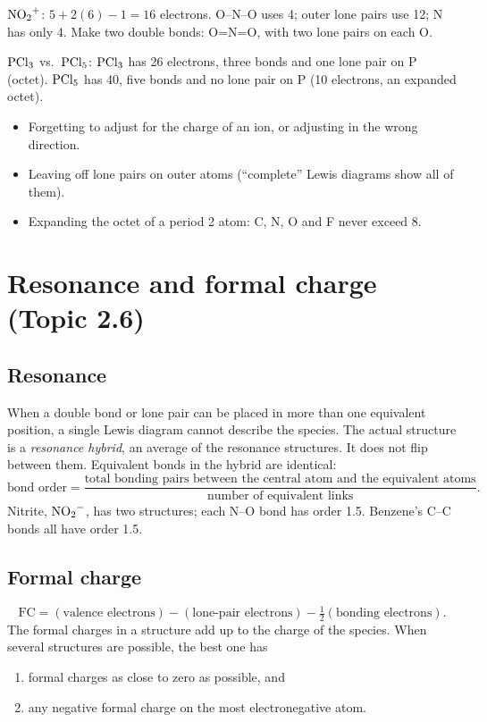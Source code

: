 \documentclass[11pt]{article}
\begin{document}
 $\ce{NO2+}$: $5 + 2(6) - 1 = 16$ electrons. O--N--O uses 4; outer lone pairs use 12; N has only 4. Make two double bonds: O=N=O, with two lone pairs on each O.

 $\ce{PCl3}$ vs.\ $\ce{PCl5}$: $\ce{PCl3}$ has 26 electrons, three bonds and one lone pair on P (octet). $\ce{PCl5}$ has 40, five bonds and no lone pair on P (10 electrons, an expanded octet).

\errorsh
\begin{itemize}
\item Forgetting to adjust for the charge of an ion, or adjusting in the wrong direction.
\item Leaving off lone pairs on outer atoms (``complete'' Lewis diagrams show all of them).
\item Expanding the octet of a period 2 atom: C, N, O and F never exceed 8.
\end{itemize}

\section{Resonance and formal charge (Topic 2.6)}\label{t:2.6}
\subsection{Resonance}
When a double bond or lone pair can be placed in more than one equivalent position, a single Lewis diagram cannot describe the species. The actual structure is a \emph{resonance hybrid}, an average of the resonance structures. It does not flip between them. Equivalent bonds in the hybrid are identical:
\[ \text{bond order} = \frac{\text{total bonding pairs between the central atom and the equivalent atoms}}{\text{number of equivalent links}}. \]
Nitrite, $\ce{NO2-}$, has two structures; each N--O bond has order 1.5. Benzene's C--C bonds all have order 1.5.

\subsection{Formal charge}
\[ \text{FC} = (\text{valence electrons}) - (\text{lone-pair electrons}) - \tfrac12(\text{bonding electrons}). \]
The formal charges in a structure add up to the charge of the species. When several structures are possible, the best one has
\begin{enumerate}
\item formal charges as close to zero as possible, and
\item any negative formal charge on the most electronegative atom.
\end{enumerate}
\end{document}
